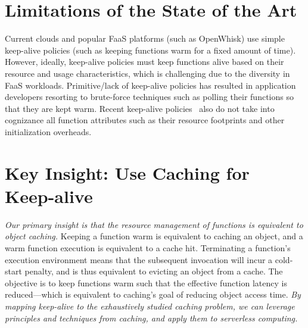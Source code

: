 \documentclass[pageno]{jpaper}
\begin{document}
\section{Limitations of the State of the Art}
\vspace*{\subsecspace}


Current clouds and popular FaaS platforms (such as OpenWhisk) use simple keep-alive policies (such as keeping functions warm for a fixed amount of time).
%
However, ideally, keep-alive policies must keep functions alive based on their resource and usage characteristics, which is challenging due to the diversity in FaaS workloads. 
%
Primitive/lack of keep-alive policies has resulted in application developers resorting to brute-force techniques such as polling their functions so that they are kept warm. 
%
Recent keep-alive policies~\cite{shahrad_serverless_2020} also do not take into cognizance all function attributes such as their resource footprints and other initialization overheads. 




\section{Key Insight: Use Caching for Keep-alive}
\vspace*{\subsecspace}

\emph{Our primary insight is that the resource management of functions is equivalent to object caching.}
Keeping a function warm is equivalent to caching an object, and a warm function execution is equivalent to a cache hit. 
Terminating a function's execution environment means that the subsequent invocation will incur a cold-start penalty, and is thus equivalent to evicting an object from a cache. 
The objective is to keep functions warm such that the effective function latency is reduced---which is equivalent to caching's goal of reducing object access time. 
\emph{By mapping keep-alive to the exhaustively studied caching problem, we can leverage principles and techniques from caching, and apply them to serverless computing.} 
\end{document}
